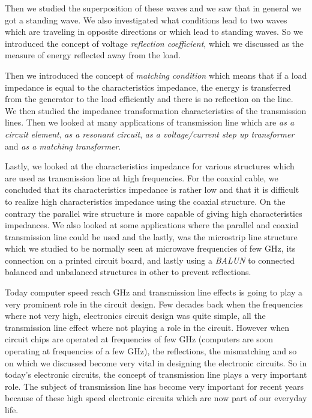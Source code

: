 Then we studied the superposition of these waves and we saw that in general we got a standing wave. We also investigated what conditions lead to two waves which are traveling in opposite directions or which lead to standing waves. So we introduced the concept of voltage \emph{reflection coefficient}, which we discussed as the measure of energy reflected away from the load.

Then we introduced the concept of \emph{matching condition} which means that if a load impedance is equal to the characteristics impedance, the energy is transferred from the generator to the load efficiently and there is no reflection on the line. We then studied the impedance transformation characteristics of the transmission lines. Then we looked at many applications of transmission line which are \emph{as a circuit element}, \emph{as a resonant circuit}, \emph{as a voltage/current step up transformer} and \emph{as a matching transformer}.

Lastly, we looked at the characteristics impedance for various structures which are used as transmission line at high frequencies. For the coaxial cable, we concluded that its characteristics impedance is rather low and that it is difficult to realize high characteristics impedance using the coaxial structure. On the contrary the parallel wire structure is more capable of giving high characteristics impedances. We also looked at some applications where the parallel and coaxial transmission line could be used and the lastly, was the microstrip line structure which we studied to be normally seen at microwave frequencies of few GHz, its connection on a printed circuit board, and lastly using a \emph{BALUN} to connected balanced and unbalanced structures in other to prevent reflections.

Today computer speed reach GHz and transmission line effects is going to play a very prominent role in the circuit design. Few decades back when the frequencies where not very high, electronics circuit design was quite simple, all the transmission line effect where not playing a role in the circuit. However when circuit chips are operated at frequencies of few GHz (computers are soon operating at frequencies of a few GHz), the reflections, the mismatching and so on which we discussed become very vital in designing the electronic circuits. So in today's electronic circuits, the concept of transmission line plays a very important role. The subject of transmission line has become very important for recent years because of these high speed electronic circuits which are now part of our everyday life.

